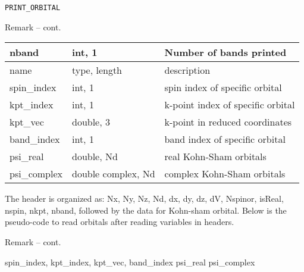 \begin{frame}[allowframebreaks]{\texttt{PRINT\_ORBITAL}}
\begin{block}{Remark -- cont.}
\begin{table}[]
\begin{tabular}{|m{1.7cm}|m{3.2cm}|m{5cm}|}
\hline
nband        & int, 1             & Number of bands printed                                                                                        \\ \hline
name         & type, length       & description                                                                                                   \\ \hline
spin\_index  & int, 1             & spin index of specific orbital                                                                                \\ \hline
kpt\_index   & int, 1             & k-point index of specific orbital                                                                             \\ \hline
kpt\_vec     & double, 3          & k-point in reduced coordinates                                                                                \\ \hline
band\_index  & int, 1             & band index of specific orbital                                                                                \\ \hline
psi\_real    & double, Nd         & real Kohn-Sham orbitals                                                                                       \\ \hline
psi\_complex & double complex, Nd & complex Kohn-Sham orbitals                                                                                    \\ \hline
\end{tabular}
\end{table}
The header is organized as: Nx, Ny, Nz, Nd, dx, dy, dz, dV, Nspinor, isReal, nspin, nkpt, nband, followed by the data for Kohn-sham orbital. Below is the pseudo-code to read orbitals after reading variables in headers. 
\end{block}

\begin{block}{Remark -- cont.}
\begin{algorithm}[H]
\begin{algorithmic}
    \State spin\_index, kpt\_index, kpt\_vec, band\_index
        \State psi\_real
    \Else
        \State psi\_complex
    \EndIf
\EndFor
\EndFor
\EndFor
\end{algorithmic}
\end{algorithm}
\end{block}

\end{frame}



